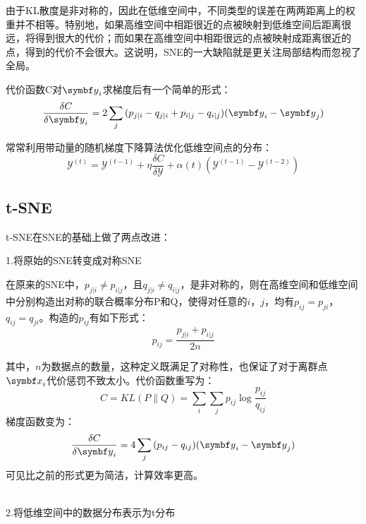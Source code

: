 由于KL散度是非对称的，因此在低维空间中，不同类型的误差在两两距离上的权重并不相等。特别地，如果高维空间中相距很近的点被映射到低维空间后距离很远，将得到很大的代价；而如果在高维空间中相距很远的点被映射成距离很近的点，得到的代价不会很大。这说明，SNE的一大缺陷就是更关注局部结构而忽视了全局。

代价函数C对$\vy_i$求梯度后有一个简单的形式：
\begin{equation}
	\frac{\delta C}{\delta \vy_i}=2\sum_{j}{(p_{j|i}-q_{j|i}+p_{i|j}-q_{i|j})(\vy_i-\vy_j)}
\end{equation}

常常利用带动量的随机梯度下降算法优化低维空间点的分布：
\begin{equation}
	\mathcal{Y}^{(t)}=\mathcal{Y}^{(t-1)}+\eta\frac{\delta C}{\delta \mathcal{Y}}+\alpha(t)(\mathcal{Y}^{(t-1)}-\mathcal{Y}^{(t-2)})
\end{equation}

\subsection{t-SNE}

t-SNE在SNE的基础上做了两点改进：

\noindent
1.将原始的SNE转变成对称SNE

在原来的SNE中，$p_{j|i}\ne p_{i|j}$，且$q_{j|i}\ne q_{i|j}$，是非对称的，则在高维空间和低维空间中分别构造出对称的联合概率分布P和Q，使得对任意的$i$，$j$，均有$p_{ij}=p_{ji}$，$q_{ij}=q_{ji}$。构造的$p_{ij}$有如下形式：
\begin{equation}
	p_{ij}=\frac{p_{j|i}+p_{i|j}}{2n}
\end{equation}

其中，$n$为数据点的数量，这种定义既满足了对称性，也保证了对于离群点$\vx_i$代价惩罚不致太小。代价函数重写为：
\begin{equation}
	C=KL(P \lVert Q)=\sum_{i}{\sum_{j}{p_{ij}\log\frac{p_{ij}}{q_{ij}}}}
\end{equation}
\noindent
梯度函数变为：
\begin{equation}
	\frac{\delta C}{\delta \vy_i}=4\sum_{j}{(p_{ij}-q_{ij})(\vy_i-\vy_j)}
\end{equation}
\noindent
可见比之前的形式更为简洁，计算效率更高。

~\\
\noindent
2.将低维空间中的数据分布表示为t分布


